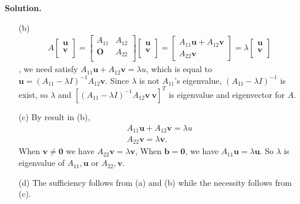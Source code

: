\documentclass[a4paper]{book}
\newenvironment{solution}%
{\noindent\textbf{Solution.}}%
{\qedhere}
\numberwithin{equation}{chapter}
\theoremstyle{definition}
\begin{document}
\begin{solution}
\begin{itemize}
        \item [(b)] \begin{align*}
            A \left[\begin{array}{c}
                \bm u \\
                \bm v \\
            \end{array}\right] =
            \left[\begin{array}{cc}
                A_{11} & A_{12} \\
                \bm O  & A_{22} \\
            \end{array}\right] 
            \left[\begin{array}{c}
                \bm u \\
                \bm v \\    
            \end{array}\right] =
            \left[\begin{array}{c}
                A_{11} \bm u + A_{12} \bm v \\
                A_{22} \bm v   
            \end{array}\right] = 
             \lambda \left[\begin{array}{c}
                \bm u \\
                \bm v \\
            \end{array}\right]
        \end{align*}
        , we need satisfy $ A_{11} \bm u + A_{12} \bm v = \lambda u$, 
        which is equal to $\bm u = (A_{11} - \lambda I)^{-1} A_{12} \bm v$.
        Since $\lambda$ is not $A_{11}$'s eigenvalue, $ (A_{11} - \lambda I)^{-1}$
        is exist, so $\lambda$ and $[(A_{11} - \lambda I)^{-1}A_{12} \bm v \ \bm v]^{T}$
        is eigenvalue and eigenvector for $A$.

        \item [(c)] By result in (b), 
        \begin{align*}
            A_{11} \bm u + A_{12} \bm v = \lambda u \\ 
            A_{22} \bm v = \lambda \bm v.
        \end{align*}
        When $\bm v \neq \bm 0$ we have $A_{22} \bm v = \lambda \bm v$,
        When $\bm b = \bm 0$, we have $A_{11} \bm u = \lambda \bm u$. 
        So $\lambda$ is eigenvalue of $A_{11}, \bm u$ or $A_{22}, \bm v$.

        \item [(d)] The sufficiency follows from (a) and (b) while the necessity follows from (c).
    \end{itemize}
\end{solution}
\end{document}
